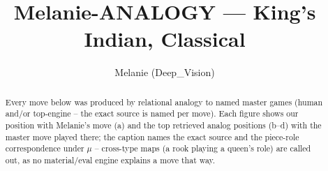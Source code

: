 \documentclass[11pt]{article}
\title{Melanie-ANALOGY — King's Indian, Classical}
\author{Melanie (Deep\_Vision)}
\date{}
\begin{document}
\maketitle

\begin{abstract}Every move below was produced by relational analogy to named master games (human and/or top-engine -- the exact source is named per move). Each figure shows our position with Melanie's move (a) and the top retrieved analog positions (b--d) with the master move played there; the caption names the exact source and the piece-role correspondence under $\mu$ -- cross-type maps (a rook playing a queen's role) are called out, as no material/eval engine explains a move that way.\end{abstract}

\begin{figure}[p]\centering
\begin{subfigure}{0.46\textwidth}\centering
\resizebox{\linewidth}{!}{%
\newchessgame
\chessboard[
  setfen={rnbq1rk1/ppp2pbp/3p1np1/4P3/2P1P3/2N2N2/PP2BPPP/R1BQK2R b KQ - 0 7},
  showmover=false,
  pgfstyle=straightmove, color=movearrow, markmove={d6-e5}
]}
\caption{}
\end{subfigure}\hfill
\begin{subfigure}{0.46\textwidth}\centering
\resizebox{\linewidth}{!}{%
\newchessgame
\chessboard[
  setfen={rnbq1rk1/ppp2pbp/3p1np1/4P3/2P1P3/2N2N2/PP2BPPP/R1BQK2R b KQ - 0 7},
  showmover=false,
  pgfstyle=straightmove, color=movearrow, markmove={d6-e5}
]}
\caption{}
\end{subfigure}
\\[4pt]
\begin{subfigure}{0.46\textwidth}\centering
\resizebox{\linewidth}{!}{%
\newchessgame
\chessboard[
  setfen={rnbq1rk1/ppp2pbp/3p1np1/4P3/2P1P3/2N2N2/PP2BPPP/R1BQK2R b KQ - 0 7},
  showmover=false,
  pgfstyle=straightmove, color=movearrow, markmove={d6-e5}
]}
\caption{}
\end{subfigure}\hfill
\begin{subfigure}{0.46\textwidth}\centering
\resizebox{\linewidth}{!}{%
\newchessgame
\chessboard[
  setfen={rnbq1rk1/ppp2pbp/3p1np1/4P3/2P1P3/2N2N1P/PP3PP1/R1BQKB1R b KQ - 0 7},
  showmover=false,
  pgfstyle=straightmove, color=movearrow, markmove={d6-e5}
]}
\caption{}
\end{subfigure}

\end{figure}
\end{document}
